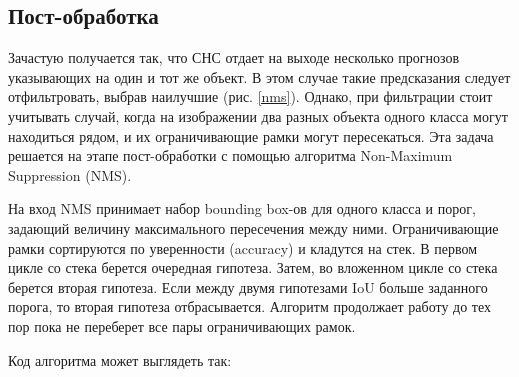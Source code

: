 \subsection{Пост-обработка}

Зачастую получается так, что СНС отдает на выходе несколько прогнозов указывающих на один и тот же объект. В этом случае такие предсказания следует отфильтровать, выбрав наилучшие (рис. \ref{nms}). Однако, при фильтрации стоит учитывать случай, когда на изображении два разных объекта одного класса могут находиться рядом, и их ограничивающие рамки могут пересекаться. Эта задача решается на этапе пост-обработки с помощью алгоритма Non-Maximum Suppression (NMS).


На вход NMS принимает набор bounding box-ов для одного класса и порог, задающий величину максимального пересечения между ними. Ограничивающие рамки сортируются по уверенности (accuracy) и кладутся на стек. В первом цикле со стека берется очередная гипотеза. Затем, во вложенном цикле со стека берется вторая гипотеза. Если между двумя гипотезами IoU больше заданного порога, то вторая гипотеза отбрасывается. Алгоритм продолжает работу до тех пор пока не переберет все пары ограничивающих рамок.

Код алгоритма может выглядеть так:

